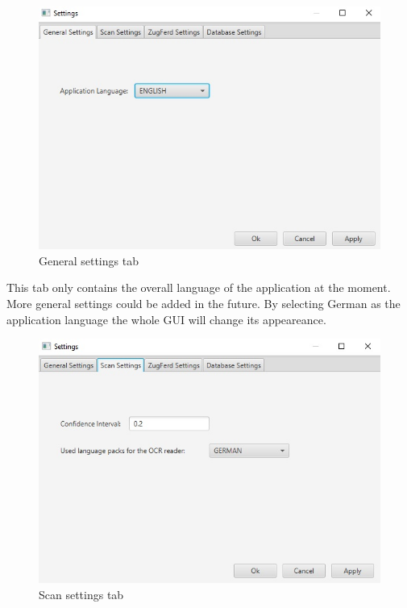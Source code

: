 \begin{figure}[ht!]
\centering
\includegraphics[width=\textwidth]{Images/GUI/settings_General.jpg}
\caption{General settings tab \label{settings_General}}
\end{figure}

This tab only contains the overall language of the application at the moment. More general settings could be added in the future. By selecting German as the application language the whole GUI will change its appeareance.

\begin{figure}[ht!]
\centering
\includegraphics[width=\textwidth]{Images/GUI/settings_Scan.jpg}
\caption{Scan settings tab \label{settings_Scan}}
\end{figure}


